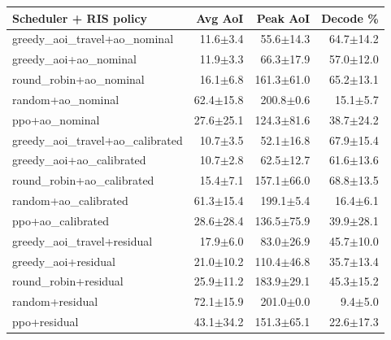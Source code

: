 \begin{tabular}{lrrr}
\toprule
Scheduler + RIS policy & Avg AoI & Peak AoI & Decode \% \\
\midrule
greedy\_aoi\_travel+ao\_nominal & 11.6$\pm$3.4 & 55.6$\pm$14.3 & 64.7$\pm$14.2 \\
greedy\_aoi+ao\_nominal & 11.9$\pm$3.3 & 66.3$\pm$17.9 & 57.0$\pm$12.0 \\
round\_robin+ao\_nominal & 16.1$\pm$6.8 & 161.3$\pm$61.0 & 65.2$\pm$13.1 \\
random+ao\_nominal & 62.4$\pm$15.8 & 200.8$\pm$0.6 & 15.1$\pm$5.7 \\
ppo+ao\_nominal & 27.6$\pm$25.1 & 124.3$\pm$81.6 & 38.7$\pm$24.2 \\
greedy\_aoi\_travel+ao\_calibrated & 10.7$\pm$3.5 & 52.1$\pm$16.8 & 67.9$\pm$15.4 \\
greedy\_aoi+ao\_calibrated & 10.7$\pm$2.8 & 62.5$\pm$12.7 & 61.6$\pm$13.6 \\
round\_robin+ao\_calibrated & 15.4$\pm$7.1 & 157.1$\pm$66.0 & 68.8$\pm$13.5 \\
random+ao\_calibrated & 61.3$\pm$15.4 & 199.1$\pm$5.4 & 16.4$\pm$6.1 \\
ppo+ao\_calibrated & 28.6$\pm$28.4 & 136.5$\pm$75.9 & 39.9$\pm$28.1 \\
greedy\_aoi\_travel+residual & 17.9$\pm$6.0 & 83.0$\pm$26.9 & 45.7$\pm$10.0 \\
greedy\_aoi+residual & 21.0$\pm$10.2 & 110.4$\pm$46.8 & 35.7$\pm$13.4 \\
round\_robin+residual & 25.9$\pm$11.2 & 183.9$\pm$29.1 & 45.3$\pm$15.2 \\
random+residual & 72.1$\pm$15.9 & 201.0$\pm$0.0 & 9.4$\pm$5.0 \\
ppo+residual & 43.1$\pm$34.2 & 151.3$\pm$65.1 & 22.6$\pm$17.3 \\
\bottomrule
\end{tabular}